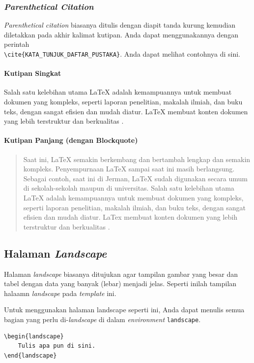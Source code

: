 \subsubsection{\textit{Parenthetical Citation}}

\textit{Parenthetical citation} biasanya ditulis dengan diapit tanda kurung kemudian diletakkan pada akhir kalimat kutipan. Anda dapat menggunakannya dengan perintah \\ \verb|\cite{KATA_TUNJUK_DAFTAR_PUSTAKA}|. Anda dapat melihat contohnya di sini.

\paragraph{Kutipan Singkat}

Salah satu kelebihan utama LaTeX adalah kemampuannya untuk membuat dokumen yang kompleks, seperti laporan penelitian, makalah ilmiah, dan buku teks, dengan sangat efisien dan mudah diatur. LaTeX membuat konten dokumen yang lebih terstruktur dan berkualitas \cite{fitriani-2024:pelatihan-latex}.

\paragraph{Kutipan Panjang (dengan Blockquote)}

\begin{quote}
    Saat ini, LaTeX semakin berkembang dan bertambah lengkap dan semakin kompleks. Penyempurnaan LaTeX sampai saat ini masih berlangsung. Sebagai contoh, saat ini di Jerman, LaTeX sudah digunakan secara umum di sekolah-sekolah maupun di universitas. Salah satu kelebihan utama LaTeX adalah kemampuannya untuk membuat dokumen yang kompleks, seperti laporan penelitian, makalah ilmiah, dan buku teks, dengan sangat efisien dan mudah diatur. LaTex membuat konten dokumen yang lebih terstruktur dan berkualitas \cite{fitriani-2024:pelatihan-latex}.
\end{quote}

\begin{landscape}
    \subsection{Halaman \textit{Landscape}}
    
    Halaman \textit{landscape} biasanya ditujukan agar tampilan gambar yang besar dan tabel dengan data yang banyak (lebar) menjadi jelas. Seperti inilah tampilan halaamn \textit{landscape} pada \textit{template} ini.
    
    Untuk menggunakan halaman landscape seperti ini, Anda dapat menulis semua bagian yang perlu di-\textit{landscape} di dalam \textit{environment} \verb|landscape|.
    
    \begin{lstlisting}
\begin{landscape}
    Tulis apa pun di sini.
\end{landscape}
    \end{lstlisting}
\end{landscape}

